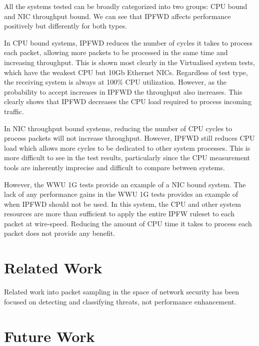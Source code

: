 \documentclass[journal]{IEEEtran}
\begin{document}
    All the systems tested can be broadly categorized into two groups: CPU
    bound and NIC throughput bound. We can see that IPFWD affects performance
    positively but differently for both types. 

    In CPU bound systems, IPFWD reduces the number of cycles it takes to
    process each packet, allowing more packets to be processed in the same time
    and increasing throughput. This is shown most clearly in the Virtualised
    system tests, which have the weakest CPU but 10Gb Ethernet NICs. Regardless
    of test type, the receiving system is always at 100\% CPU utilization.
    However, as the probability to accept increases in IPFWD the throughput
    also increases.  This clearly shows that IPFWD decreases the CPU load
    required to process incoming traffic.

    In NIC throughput bound systems, reducing the number of CPU cycles to
    process packets will not increase throughput. However, IPFWD still reduces
    CPU load which allows more cycles to be dedicated to other system
    processes. This is more difficult to see in the test results, particularly
    since the CPU measurement tools are inherently imprecise and difficult to
    compare between systems. 
    
    However, the WWU 1G tests provide an example of a NIC bound system. The
    lack of any performance gains in the WWU 1G tests provides an example of
    when IPFWD should not be used. In this system, the CPU and other system
    resources are more than sufficient to apply the entire IPFW ruleset to each
    packet at wire-speed. Reducing the amount of CPU time it takes to process
    each packet does not provide any benefit.


\section{Related Work}

  Related work \cite{exploitingpacketsampling, analysisnetflow,
  monitoringpacketsampling} into packet sampling in the space of network
  security has been focused on detecting and classifying threats, not
  performance enhancement.



\section{Future Work}
\end{document}

